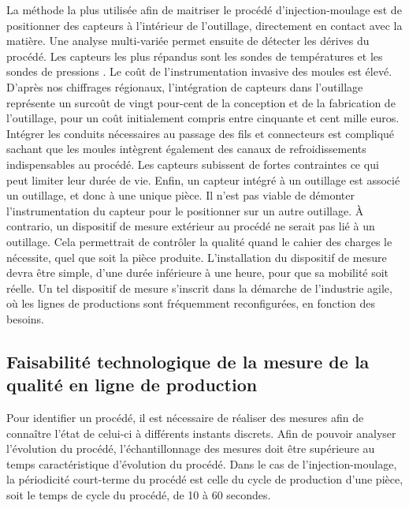 La méthode la plus utilisée afin de maitriser le procédé d'injection-moulage est de positionner des capteurs à l’intérieur de l'outillage, directement en contact avec la matière.
Une analyse multi-variée permet ensuite de détecter les dérives du procédé.
Les capteurs les plus répandus sont les sondes de températures et les sondes de pressions \cite{kurt_experimental_2009}.
Le coût de l’instrumentation invasive des moules est élevé.
D’après nos chiffrages régionaux, l’intégration de capteurs dans l'outillage représente un surcoût de vingt pour-cent de la conception et de la fabrication de l'outillage, pour un coût initialement compris entre cinquante et cent mille euros.
Intégrer les conduits nécessaires au passage des fils et connecteurs est compliqué sachant que les moules intègrent également des canaux de refroidissements indispensables au procédé.
Les capteurs subissent de fortes contraintes ce qui peut limiter leur durée de vie.
Enfin, un capteur intégré à un outillage est associé un outillage, et donc à une unique pièce.
Il n'est pas viable de démonter l'instrumentation du capteur pour le positionner sur un autre outillage.
À contrario, un dispositif de mesure extérieur au procédé ne serait pas lié à un outillage.
Cela permettrait de contrôler la qualité quand le cahier des charges le nécessite, quel que soit la pièce produite.
L'installation du dispositif de mesure devra être simple, d'une durée inférieure à une heure, pour que sa mobilité soit réelle.
Un tel dispositif de mesure s'inscrit dans la démarche de l'industrie agile, où les lignes de productions sont fréquemment reconfigurées, en fonction des besoins.


\subsection{Faisabilité technologique de la mesure de la qualité en ligne de production}
Pour identifier un procédé, il est nécessaire de réaliser des mesures afin de connaître l'état de celui-ci à différents instants discrets.
Afin de pouvoir analyser l'évolution du procédé, l'échantillonnage des mesures doit être supérieure au temps caractéristique d'évolution du procédé.
Dans le cas de l'injection-moulage, la périodicité court-terme du procédé est celle du cycle de production d'une pièce, soit le temps de cycle du procédé, de 10 à 60 secondes.

